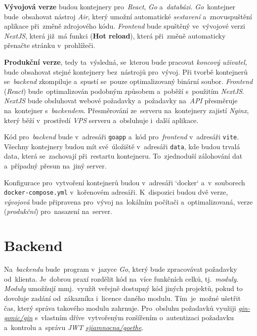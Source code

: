 \documentclass[11pt,a4paper]{report}
\begin{document}
        \textbf{Vývojová verze} budou kontejnery pro~\emph{React}, \emph{Go} a~\emph{databázi}. \emph{Go}~kontejner bude~obsahovat nástroj \emph{Air}, který umožní automatické \emph{sestavení} a~znovuspuštění aplikace při~změně zdrojového kódu. \emph{Frontend} bude spuštěný ve~vývojové verzi \emph{NextJS}, která již~má funkci (\textbf{Hot reload}), která při~změně automaticky přenačte stránku v~prohlížeči.

        \textbf{Produkční verze}, tedy ta~výsledná, se~kterou bude pracovat \emph{koncový uživatel}, bude obsahovat stejné kontejnery bez~nástrojů pro~vývoj. Při tvorbě kontejnerů se~\emph{backend} zkompiluje a~spustí se~pouze optimalizovaný binární soubor. \emph{Frontend} (\emph{React}) bude~optimalizován podobným způsobem a~poběží s~použitím \emph{NextJS}. \emph{NextJS} bude obsluhovat webové požadavky a~požadavky na~\emph{API} přesměruje na~kontejner s~\emph{backendem}. Přesměrování ze~serveru na~kontejnery zajistí \emph{Nginx}, který běží v~prostředí \emph{VPS} serveru a~obsluhuje i~další aplikace.

        Kód pro~\emph{backend} bude v~adresáři \texttt{goapp} a~kód pro~\emph{frontend} v~adresáři \texttt{vite}. Všechny kontejnery budou mít své~úložiště v~adresáři \texttt{data}, kde budou trvalá data, která se~zachovají při~restartu kontejneru. To~zjednoduší zálohování dat a~případný přesun na~jiný server.

        Konfigurace pro~vytvoření kontejnerů budou v~adresáři `docker` a~v~souborech \texttt{docker-compose.yml} v~kořenovém adresáři. K~dispozici budou dvě verze, \emph{vývojová} bude připravena pro~vývoj na~lokálním počítači a~optimalizovaná, verze (\emph{produkční}) pro~nasazení na~server.
        
        \section{Backend}
            Na~\emph{backendu} bude~program v~jazyce \emph{Go}, který bude zpracovávat požadavky od~klienta. Je~dobrou praxí rozdělit kód na~více funkčních celků, tj.~\emph{moduly}. \emph{Moduly} umožňují mmj.~využít veřejně dostupný kód jiných projektů, pokud to dovoluje zadání od~zákazníka i~licence daného modulu. Tím~je~možné ušetřit čas, který správa takového modulu zahrnuje. \cite{Zimmerman2023:howtowritebetter}
            Pro~obsluhu požadavků využiji \href{https://github.com/gin-gonic/gin}{\emph{gin-gonic/gin}} s~vlastním dříve~vytvořeným rozšířením o~autentizaci požadavku a~kontrolu a~správu \emph{JWT} \href{https://gitlab.com/sjiamnocna/goethe}{\emph{sjiamnocna/goethe}}.
\end{document}
